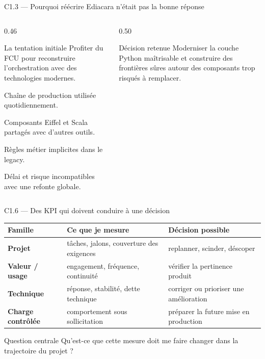 \begin{frame}{C1.3 — Pourquoi réécrire Ediacara n'était pas la bonne réponse}
\begin{columns}[T]
\begin{column}{0.46\linewidth}
\begin{block}{La tentation initiale}
Profiter du FCU pour reconstruire l'orchestration avec des technologies modernes.
\end{block}
\begin{tightitems}
  \item Chaîne de production utilisée quotidiennement.
  \item Composants Eiffel et Scala partagés avec d'autres outils.
  \item Règles métier implicites dans le legacy.
  \item Délai et risque incompatibles avec une refonte globale.
\end{tightitems}
\end{column}
\begin{column}{0.50\linewidth}
\begin{block}{Décision retenue}
Moderniser la couche Python maîtrisable et construire des frontières sûres autour des composants trop risqués à remplacer.
\end{block}
\centering
{}
\end{column}
\end{columns}
\end{frame}

\begin{frame}{C1.6 — Des KPI qui doivent conduire à une décision}
\scriptsize
\begin{tabularx}{\linewidth}{>{\bfseries}p{3.0cm}X X}
\toprule
Famille & Ce que je mesure & Décision possible \\
\midrule
Projet & tâches, jalons, couverture des exigences & replanner, scinder, déscoper \\
Valeur / usage & engagement, fréquence, continuité & vérifier la pertinence produit \\
Technique & réponse, stabilité, dette technique & corriger ou prioriser une amélioration \\
Charge contrôlée & comportement sous sollicitation & préparer la future mise en production \\
\bottomrule
\end{tabularx}
\vspace{0.7em}
\begin{block}{Question centrale}
Qu'est-ce que cette mesure doit me faire changer dans la trajectoire du projet ?
\end{block}
\end{frame}

